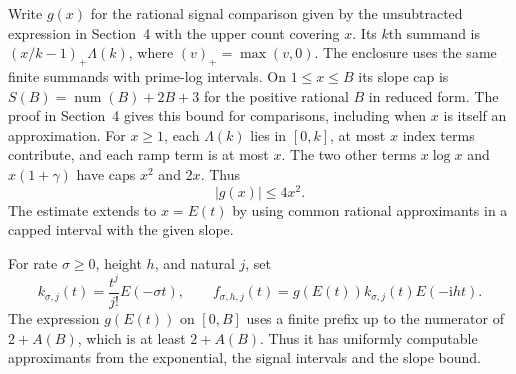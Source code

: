 \documentclass[11pt]{amsart}
\theoremstyle{definition}
\theoremstyle{remark}
\numberwithin{equation}{section}
\begin{document}
Write \(g(x)\) for the rational signal comparison given by the
unsubtracted expression in Section~4 with the upper count covering
\(x\). Its \(k\)th summand is \((x/k-1)_+\Lambda(k)\), where
\((v)_+=\max(v,0)\). The enclosure uses the same finite summands
with prime-log intervals. On \(1\le x\le B\) its slope cap is
\(S(B)=\operatorname{num}(B)+2B+3\) for the positive rational \(B\)
in reduced form. The proof in Section~4 gives this bound for
comparisons, including when \(x\) is itself an approximation.
For \(x\ge1\), each \(\Lambda(k)\) lies in \([0,k]\),
at most \(x\) index terms contribute, and each ramp term is at
most \(x\). The two other terms \(x\log x\) and
\(x(1+\gamma)\) have caps \(x^2\) and \(2x\). Thus
\begin{equation}\label{eq:mellin-signal-growth}
                         |g(x)|\le4x^2 .
\end{equation}
The estimate extends to \(x=E(t)\) by using common rational
approximants in a capped interval with the given slope.

For rate \(\sigma\ge0\), height \(h\), and natural \(j\), set
\begin{equation}\label{eq:mellin-sample-target}
    k_{\sigma,j}(t)=\frac{t^j}{j!}E(-\sigma t),\qquad
    f_{\sigma,h,j}(t)=g(E(t))k_{\sigma,j}(t)E(-\mathrm i ht).
\end{equation}
The expression \(g(E(t))\) on \([0,B]\) uses a finite prefix up to
the numerator of \(2+A(B)\), which is at least \(2+A(B)\).
Thus it has uniformly computable approximants from the exponential,
the signal intervals and the slope bound.
\end{document}
